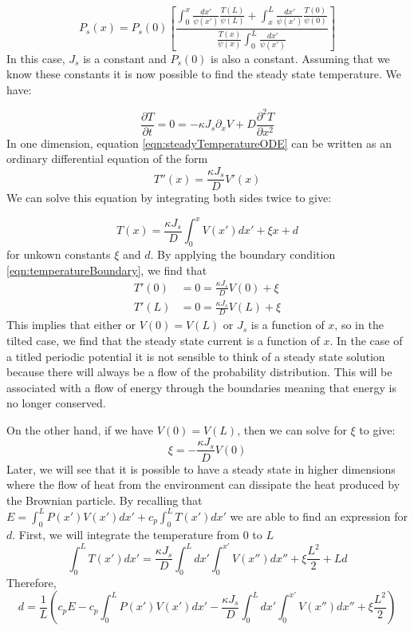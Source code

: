 \begin{equation}
P_s(x) = P_s(0) \left [\frac{\int_0^x \frac{dx'}{\psi(x')} \frac{T(L)}{\psi(L)} + \int_x^L \frac{dx'}{\psi(x')} \frac{T(0)}{\psi(0)} }{\frac{T(x)}{\psi(x)} \int_0^L \frac{dx'}{\psi(x')} } \right]
\label{eqn:SteadyDensity}
\end{equation}
In this case, $J_s$ is a constant and $P_s(0)$ is also a constant. Assuming that we know these constants it is now possible to find the steady state temperature. We have:

\begin{equation}
\frac{\partial T}{\partial t} = 0 = -\kappa J_s \partial_x V + D \frac{\partial^2 T}{\partial x^2} \label{eqn:steadyTemperatureODE}
\end{equation}
In one dimension, equation \ref{eqn:steadyTemperatureODE} can be written as an ordinary differential equation of the form
\begin{equation}
T''(x) = \frac{\kappa J_s}{D} V'(x)
\end{equation}
We can solve this equation by integrating both sides twice to give:

\begin{equation}
T(x) = \frac{\kappa J_s}{D} \int_0^x V(x') dx' + \xi x + d \label{eqn:steadyTemperature}
\end{equation}
for unkown constants $\xi$ and $d$. By applying the boundary condition \ref{eqn:temperatureBoundary}, we find that
\begin{align}
T'(0) & = 0 = \frac{\kappa J_s}{D} V(0) + \xi \\
T'(L) & = 0 = \frac{\kappa J_s}{D} V(L) + \xi
\end{align}
This implies that either or $V(0) = V(L)$ or $J_s$ is a function of $x$, so in the tilted case, we find that the steady state current is a function of $x$. In the case of a titled periodic potential it is not sensible to think of a steady state solution because there will always be a flow of the probability distribution. This will be associated with  a flow of energy through the boundaries meaning that energy is no longer conserved.

On the other hand, if we have $V(0) = V(L)$, then we can solve for $\xi$ to give:
\begin{equation}
\xi = - \frac{\kappa J_s}{D} V(0)
\end{equation}
Later, we will see that it is possible to have a steady state in higher dimensions where the flow of heat from the environment can dissipate the heat produced by the Brownian particle. By recalling that $E = \int_0^L P(x') V(x') dx' + c_p \int_0^L T(x') dx'$ we are able to find an expression for $d$. First, we will integrate the temperature from $0$ to $L$
\begin{equation}
\int_0^L T(x') dx' = \frac{\kappa J_s}{D} \int_0^L dx' \int_0^{x'} V(x'') dx'' + \xi \frac{L^2}{2} + L d
\end{equation}
Therefore,
\begin{equation}
	d = \frac{1}{L} \left(c_p E - c_p \int_0^L P(x') V(x') dx' - \frac{\kappa J_s}{D} \int_0^L dx' \int_0^{x'} V(x'') d x'' + \xi \frac{L^2}{2} \right)
\end{equation}

